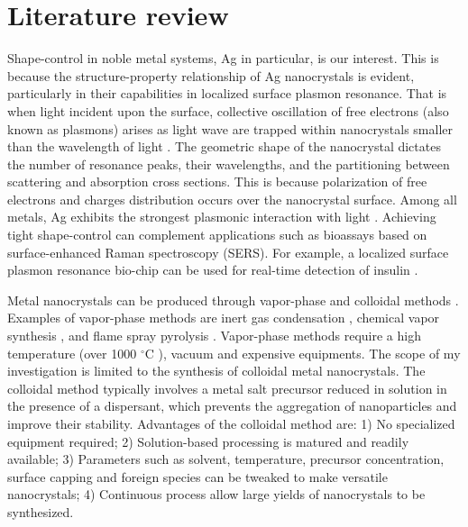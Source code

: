 \section{Literature review}

Shape-control in noble metal systems, Ag in particular, is our interest.
This is because the structure-property relationship of Ag nanocrystals is evident, particularly in their capabilities in localized surface plasmon resonance.
That is when light incident upon the surface, collective oscillation of free electrons (also known as plasmons) arises as light wave are trapped within nanocrystals smaller than the wavelength of light \cite{Petryayeva_2011}.
The geometric shape of the nanocrystal dictates the number of resonance peaks, their wavelengths, and the partitioning between scattering and absorption cross sections.
This is because polarization of free electrons and charges distribution occurs over the nanocrystal surface.
Among all metals, Ag exhibits the strongest plasmonic interaction with light \cite{Lu_2009}.
Achieving tight shape-control can complement applications such as bioassays based on surface-enhanced Raman spectroscopy (SERS).
For example, a localized surface plasmon resonance bio-chip can be used for real-time detection of insulin \cite{Hiep_2008}.

Metal nanocrystals can be produced through vapor-phase \cite{Swihart_2003} and colloidal methods \cite{Tao_2008}. Examples of vapor-phase methods are inert gas condensation \cite{Wegner_2002,Simchi_2007}, chemical vapor synthesis \cite{Lee_2012,Ostraat_2001}, and flame spray pyrolysis \cite{Teoh_2010}. 
Vapor-phase methods require a high temperature (over 1000 $^{\circ}$C \cite{Smetana_2005}), vacuum and expensive equipments.
The scope of my investigation is limited to the synthesis of colloidal metal nanocrystals.
The colloidal method typically involves a metal salt precursor reduced in solution in the presence of a dispersant, which prevents the aggregation of nanoparticles and improve their stability.
Advantages of the colloidal method are: 
1) No specialized equipment required; 
2) Solution-based processing is matured and readily available;
3) Parameters such as solvent, temperature, precursor concentration, surface capping and foreign species can be tweaked to make versatile nanocrystals;
4) Continuous process allow large yields of nanocrystals to be synthesized.

